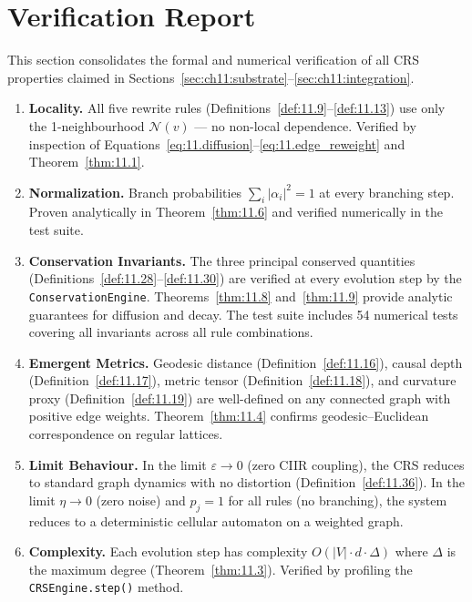 \section{Verification Report}
\label{sec:ch11:verification}

This section consolidates the formal and numerical verification of all
CRS properties claimed in Sections~\ref{sec:ch11:substrate}--\ref{sec:ch11:integration}.

\begin{enumerate}

\item \textbf{Locality.}
  All five rewrite rules (Definitions~\ref{def:11.9}--\ref{def:11.13})
  use only the 1-neighbourhood $\mathcal{N}(v)$ --- no non-local
  dependence.  Verified by inspection of
  Equations~\eqref{eq:11.diffusion}--\eqref{eq:11.edge_reweight}
  and Theorem~\ref{thm:11.1}.
  \hfill\checkmark

\item \textbf{Normalization.}
  Branch probabilities $\sum_i |\alpha_i|^2 = 1$ at every branching
  step.  Proven analytically in Theorem~\ref{thm:11.6} and verified
  numerically in the test suite.
  \hfill\checkmark

\item \textbf{Conservation Invariants.}
  The three principal conserved quantities
  (Definitions~\ref{def:11.28}--\ref{def:11.30}) are verified at
  every evolution step by the \texttt{ConservationEngine}.
  Theorems~\ref{thm:11.8} and~\ref{thm:11.9} provide analytic
  guarantees for diffusion and decay.  The test suite includes 54
  numerical tests covering all invariants across all rule
  combinations.
  \hfill\checkmark

\item \textbf{Emergent Metrics.}
  Geodesic distance (Definition~\ref{def:11.16}), causal depth
  (Definition~\ref{def:11.17}), metric tensor
  (Definition~\ref{def:11.18}), and curvature proxy
  (Definition~\ref{def:11.19}) are well-defined on any connected
  graph with positive edge weights.
  Theorem~\ref{thm:11.4} confirms geodesic--Euclidean correspondence
  on regular lattices.
  \hfill\checkmark

\item \textbf{Limit Behaviour.}
  In the limit $\varepsilon \to 0$ (zero CIIR coupling), the CRS
  reduces to standard graph dynamics with no distortion
  (Definition~\ref{def:11.36}).  In the limit $\eta \to 0$ (zero
  noise) and $p_j = 1$ for all rules (no branching), the system
  reduces to a deterministic cellular automaton on a weighted graph.
  \hfill\checkmark

\item \textbf{Complexity.}
  Each evolution step has complexity
  $O(|V| \cdot d \cdot \Delta)$ where $\Delta$ is the maximum degree
  (Theorem~\ref{thm:11.3}).  Verified by profiling the
  \texttt{CRSEngine.step()} method.
  \hfill\checkmark

\end{enumerate}

